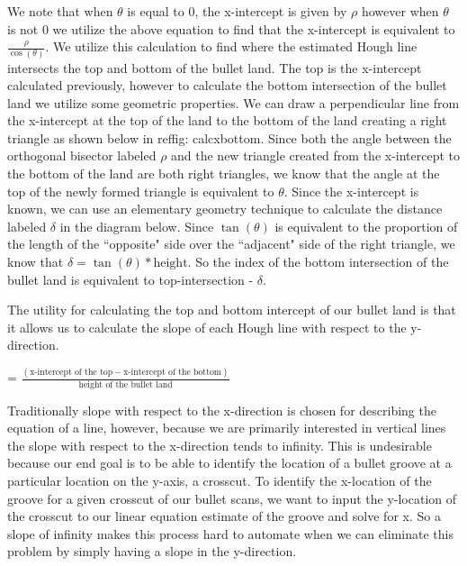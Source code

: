 \documentclass[12pt]{article}\usepackage[]{graphicx}\usepackage[]{color}
\theoremstyle{nonumberplain}
\begin{document}
We note that when $\theta$ is equal to 0, the x-intercept is given by $\rho$ however when $\theta$ is not 0 we utilize the above equation to find that the x-intercept is equivalent to $\frac{\rho}{\cos(\theta)}$.  We utilize this calculation to find where the estimated Hough line intersects the top and bottom of the bullet land. The top is the x-intercept calculated previously, however to calculate the bottom intersection of the bullet land we utilize some geometric properties. We can draw a perpendicular line from the x-intercept at the top of the land to the bottom of the land creating a right triangle as shown below in ref{fig: calcxbottom}. Since both the angle between the orthogonal bisector labeled $\rho$ and the new triangle created from the x-intercept to the bottom of the land are both right triangles, we know that the angle at the top of the newly formed triangle is equivalent to $\theta$. Since the x-intercept is known, we can use an elementary geometry technique to calculate the distance labeled $\delta$ in the diagram below. Since $\tan(\theta)$ is equivalent to the proportion of the length of the ``opposite" side over the ``adjacent" side of the right triangle, we know that $\delta = \tan(\theta)*\text{height}$. So the index of the bottom intersection of the bullet land is equivalent to top-intersection - $\delta$. 


The utility for calculating the top and bottom intercept of our bullet land is that it allows us to calculate the slope of each Hough line with respect to the y-direction. 
\begin{center}
 = $\frac{(\text{x-intercept of the top} - \text{x-intercept of the bottom})}{\text{height of the bullet land}}$
\end{center}

Traditionally slope with respect to the x-direction is chosen for describing the equation of a line, however, because we are primarily interested in vertical lines the slope with respect to the x-direction tends to infinity. This is undesirable because our end goal is to be able to identify the location of a bullet groove at a particular location on the y-axis, a crosscut. To identify the x-location of the groove for a given crosscut of our bullet scans, we want to input the y-location of the crosscut to our linear equation estimate of the groove and solve for x. So a slope of infinity makes this process hard to automate when we can eliminate this problem by simply having a slope in the y-direction. 
\end{document}
